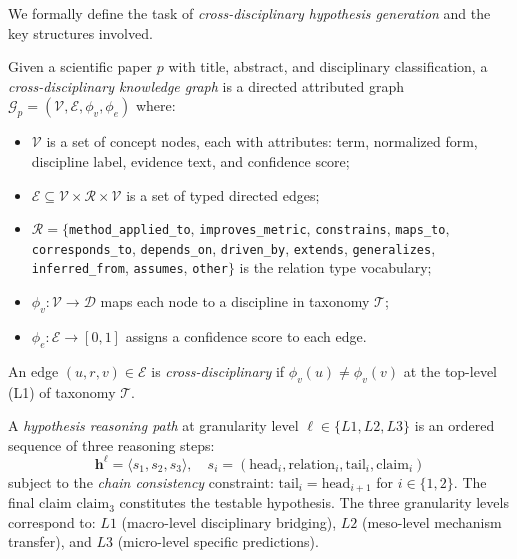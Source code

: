 \documentclass{article}
\begin{document}
We formally define the task of \emph{cross-disciplinary hypothesis generation} and the key structures involved.

\begin{definition}
\label{def:kg}
Given a scientific paper $p$ with title, abstract, and disciplinary classification, a \emph{cross-disciplinary knowledge graph} is a directed attributed graph $\mathcal{G}_p = (\mathcal{V}, \mathcal{E}, \phi_v, \phi_e)$ where:
\begin{itemize}[leftmargin=*,topsep=1pt,itemsep=0pt]
\item $\mathcal{V}$ is a set of concept nodes, each with attributes: term, normalized form, discipline label, evidence text, and confidence score;
\item $\mathcal{E} \subseteq \mathcal{V} \times \mathcal{R} \times \mathcal{V}$ is a set of typed directed edges;
\item $\mathcal{R} = \{$\texttt{method\_applied\_to}, \texttt{improves\_metric}, \texttt{constrains}, \texttt{maps\_to}, \texttt{corresponds\_to}, \texttt{depends\_on}, \texttt{driven\_by}, \texttt{extends}, \texttt{generalizes}, \texttt{inferred\_from}, \texttt{assumes}, \texttt{other}$\}$ is the relation type vocabulary;
\item $\phi_v: \mathcal{V} \to \mathcal{D}$ maps each node to a discipline in taxonomy $\mathcal{T}$;
\item $\phi_e: \mathcal{E} \to [0,1]$ assigns a confidence score to each edge.
\end{itemize}
An edge $(u, r, v) \in \mathcal{E}$ is \emph{cross-disciplinary} if $\phi_v(u) \neq \phi_v(v)$ at the top-level (L1) of taxonomy $\mathcal{T}$.
\end{definition}

\begin{definition}
\label{def:path}
A \emph{hypothesis reasoning path} at granularity level $\ell \in \{L1, L2, L3\}$ is an ordered sequence of three reasoning steps:
\[
\mathbf{h}^\ell = \langle s_1, s_2, s_3 \rangle, \quad s_i = (\text{head}_i, \text{relation}_i, \text{tail}_i, \text{claim}_i)
\]
subject to the \emph{chain consistency} constraint: $\text{tail}_i = \text{head}_{i+1}$ for $i \in \{1, 2\}$.
The final claim $\text{claim}_3$ constitutes the testable hypothesis.
The three granularity levels correspond to: $L1$ (macro-level disciplinary bridging), $L2$ (meso-level mechanism transfer), and $L3$ (micro-level specific predictions).
\end{definition}
\end{document}
